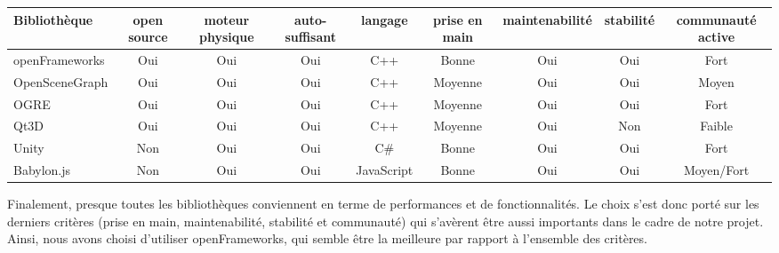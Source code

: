 \newpage
\begin{landscape}
\hspace{-4.5cm} 
\begin{tabular}{l|c|c|c|c|c|c|c|c}
Bibliothèque & open source & moteur physique & auto-suffisant & langage & prise en main & maintenabilité & stabilité & communauté active\\
\hline
openFrameworks & Oui & Oui & Oui & C++ & Bonne & Oui & Oui & Fort\\
OpenSceneGraph & Oui & Oui & Oui & C++ & Moyenne & Oui & Oui & Moyen\\ 
OGRE & Oui & Oui & Oui & C++ & Moyenne & Oui & Oui & Fort\\
Qt3D & Oui & Oui & Oui & C++ & Moyenne & Oui & Non & Faible\\
Unity & Non & Oui & Oui & C\# & Bonne & Oui & Oui & Fort\\
Babylon.js  & Non & Oui & Oui & JavaScript & Bonne & Oui & Oui & Moyen/Fort
\end{tabular}
\end{landscape}

Finalement, presque toutes les bibliothèques conviennent en terme de performances et de fonctionnalités. Le choix s'est donc porté sur les derniers critères (prise en main, maintenabilité, stabilité et communauté) qui s'avèrent être aussi importants dans le cadre de notre projet. Ainsi, nous avons choisi d'utiliser openFrameworks, qui semble être la meilleure par rapport à l'ensemble des critères.  

